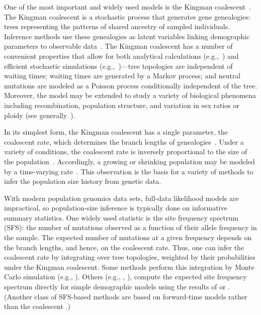 \documentclass[11pt, letterpaper]{article}   	%
\begin{document}
One of the most important and widely used models is the Kingman coalescent~\autocite{Kingman1982a, Kingman1982b, Kingman1982c, Hudson1983, Tajima1983}.
The Kingman coalescent is a stochastic process that generates gene genealogies: trees representing the patterns of shared ancestry of sampled individuals.
Inference methods use these genealogies as latent variables linking demographic parameters to observable data~\autocite{RosenbergNordborg2002}.
The Kingman coalescent has a number of convenient properties that allow for both analytical calculations (e.g.,~\cite{Tajima1989}) and efficient stochastic simulations (e.g.,~\cite{ms})---tree topologies are independent of waiting times; waiting times are generated by a Markov process; and neutral mutations are modeled as a Poisson process conditionally independent of the tree.
Moreover, the model may be extended to study a variety of biological phenomena including recombination, population structure, and variation in sex ratios or ploidy (see generally~\cite{Wakeley2009}).

In its simplest form, the Kingman coalescent has a single parameter, the coalescent rate, which determines the branch lengths of genealogies~\autocite{Kingman1982a}.
Under a variety of conditions, the coalescent rate is inversely proportional to the size of the population~\autocite{Kingman1982b}.
Accordingly, a growing or shrinking population may be modeled by a time-varying rate~\autocite{GriffithsTavare1994, GriffithsTavare1998}.
This observation is the basis for a variety of methods to infer the population size history from genetic data.

With modern population genomics data sets, full-data likelihood models are impractical, so population-size inference is typically done on informative summary statistics.
One widely used statistic is the site frequency spectrum (SFS): the number of mutations observed as a function of their allele frequency in the sample.
The expected number of mutations at a given frequency depends on the branch lengths, and hence, on the coalescent rate.
Thus, one can infer the coalescent rate by integrating over tree topologies, weighted by their probabilities under the Kingman coalescent.
Some methods perform this integration by Monte Carlo simulation (e.g., \cite{CoventryEtAl2010, ExcoffierEtAl2013}).
Others (e.g., \cite{Nielsen2000}, \cite{BhaskarEtAl2015}), compute the expected site frequency spectrum directly for simple demographic models using the results of \cite{GriffithsTavare1998} or \cite{PolanskiKimmel2003}.
(Another class of SFS-based methods are based on forward-time models rather than the coalescent \autocite{GutenkunstEtAl2009, LukicEtAl2011, RagsdaleGutenkunst2017, JouganousEtAl2017}.)
\end{document}
